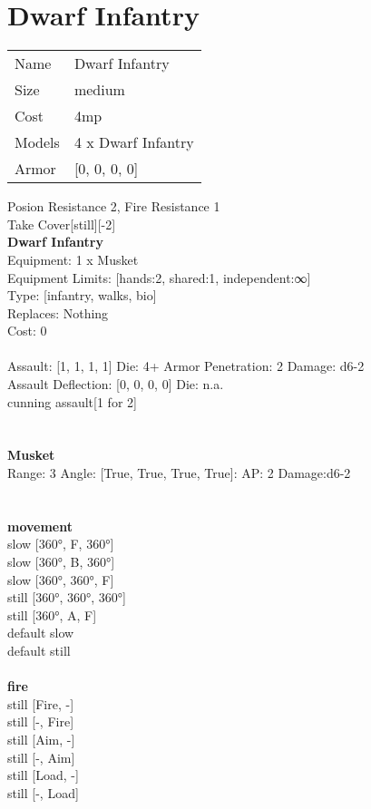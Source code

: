 \pagebreak

\section{ Dwarf Infantry }

\begin{tabular}{ll}
  Name & Dwarf Infantry \\
  Size & medium\\
  Cost & 4mp\\
  Models & 4 x Dwarf Infantry\\
  Armor & [0, 0, 0, 0]\\
\end{tabular}

\noindent Posion Resistance 2, Fire Resistance 1\\ 
Take Cover[still][-2]\\ 


{\bf Dwarf Infantry } \\
Equipment: 1 x Musket \\
Equipment Limits: [hands:2, shared:1, independent:∞] \\
Type: [infantry, walks, bio] \\
Replaces: Nothing \\
Cost: 0\\
\ \\
Assault: [1, 1, 1, 1] Die: 4+ Armor Penetration: 2 Damage: d6-2 \\
Assault Deflection: [0, 0, 0, 0] Die: n.a.\\
\indent cunning assault[1 for 2]\\ 
 
\ \\

\ \\
{\bf Musket } \\



Range: 3  Angle: [True, True, True, True]: AP: 2 Damage:d6-2 \\




 
\ \\



\ \\ {\bf movement } \\
slow [360°, F, 360°] \\
slow [360°, B, 360°] \\
slow [360°, 360°, F] \\
still [360°, 360°, 360°] \\
still [360°, A, F] \\
default slow \\
default still \\
\ \\ {\bf fire } \\
still [Fire, -] \\
still [-, Fire] \\
still [Aim, -] \\
still [-, Aim] \\
still [Load, -] \\
still [-, Load] \\



